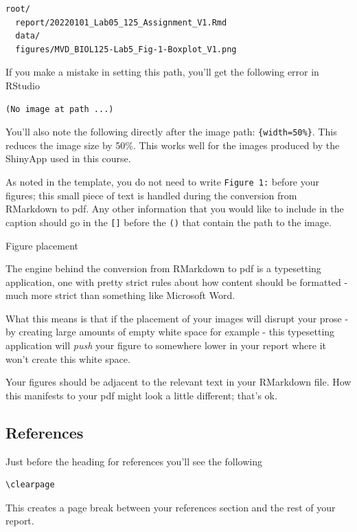 \documentclass[
]{book}
\begin{document}
\begin{verbatim}
root/
  report/20220101_Lab05_125_Assignment_V1.Rmd
  data/
  figures/MVD_BIOL125-Lab5_Fig-1-Boxplot_V1.png
\end{verbatim}

If you make a mistake in setting this path, you'll get the following error in RStudio

\begin{verbatim}
(No image at path ...)
\end{verbatim}

You'll also note the following directly after the image path: \texttt{\{width=50\%\}}. This reduces the image size by 50\%. This works well for the images produced by the ShinyApp used in this course.

As noted in the template, you do not need to write \texttt{Figure\ 1:} before your figures; this small piece of text is handled during the conversion from RMarkdown to pdf. Any other information that you would like to include in the caption should go in the \texttt{{[}{]}} before the \texttt{()} that contain the path to the image.

Figure placement

The engine behind the conversion from RMarkdown to pdf is a typesetting application, one with pretty strict rules about how content should be formatted - much more strict than something like Microsoft Word.

What this means is that if the placement of your images will disrupt your prose - by creating large amounts of empty white space for example - this typesetting application will \emph{push} your figure to somewhere lower in your report where it won't create this white space.

Your figures should be adjacent to the relevant text in your RMarkdown file. How this manifests to your pdf might look a little different; that's ok.

\hypertarget{references-1}{%
\subsection*{References}\label{references-1}}

Just before the heading for references you'll see the following

\begin{verbatim}
\clearpage
\end{verbatim}

This creates a page break between your references section and the rest of your report.
\end{document}

